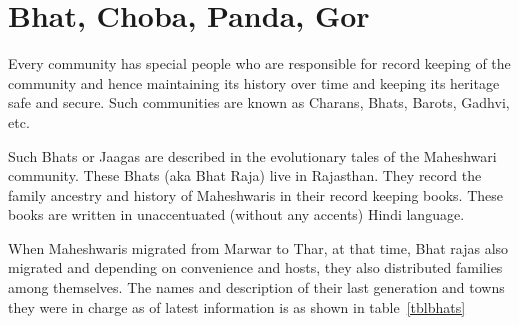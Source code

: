 \chapter{Bhat, Choba, Panda, Gor}
Every community has special people who are responsible for record keeping of
the community and hence maintaining its history over time and keeping its
heritage safe and secure. Such communities are known as Charans, Bhats, Barots,
Gadhvi, etc.

Such Bhats or Jaagas are described in the evolutionary tales of the Maheshwari
community. These Bhats (aka Bhat Raja) live in Rajasthan. They record the
family ancestry and history of Maheshwaris in their record keeping books. These
books are written in unaccentuated (without any accents) Hindi language.

When Maheshwaris migrated from Marwar to Thar, at that time, Bhat rajas also
migrated and depending on convenience and hosts, they also distributed families
among themselves. The names and description of their last generation and towns
they were in charge as of latest information is as shown in table~\ref{tblbhats}


